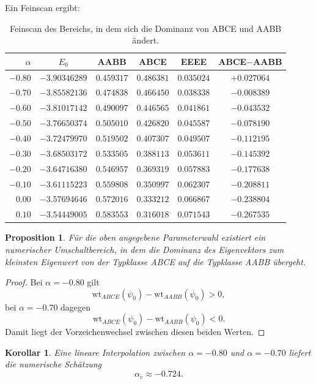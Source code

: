 \documentclass[11pt,a4paper]{article}
\newtheorem{proposition}[definition]{Proposition}
\newtheorem{corollary}[definition]{Korollar}
\theoremstyle{remark}
\newcommand{\wt}{\mathrm{wt}}
\begin{document}
	Ein Feinscan ergibt:
	
	\begin{table}[h]
		\centering
		\begin{tabular}{rccccc}
			\toprule
			$\alpha$ & $E_0$ & AABB & ABCE & EEEE & ABCE$-$AABB \\
			\midrule
			$-0.80$ & $-3.90346289$ & $0.459317$ & $0.486381$ & $0.035024$ & $+0.027064$ \\
			$-0.70$ & $-3.85582136$ & $0.474838$ & $0.466450$ & $0.038338$ & $-0.008389$ \\
			$-0.60$ & $-3.81017142$ & $0.490097$ & $0.446565$ & $0.041861$ & $-0.043532$ \\
			$-0.50$ & $-3.76650374$ & $0.505010$ & $0.426820$ & $0.045587$ & $-0.078190$ \\
			$-0.40$ & $-3.72479970$ & $0.519502$ & $0.407307$ & $0.049507$ & $-0.112195$ \\
			$-0.30$ & $-3.68503172$ & $0.533505$ & $0.388113$ & $0.053611$ & $-0.145392$ \\
			$-0.20$ & $-3.64716380$ & $0.546957$ & $0.369319$ & $0.057883$ & $-0.177638$ \\
			$-0.10$ & $-3.61115223$ & $0.559808$ & $0.350997$ & $0.062307$ & $-0.208811$ \\
			$0.00$  & $-3.57694646$ & $0.572016$ & $0.333212$ & $0.066867$ & $-0.238804$ \\
			$0.10$  & $-3.54449005$ & $0.583553$ & $0.316018$ & $0.071543$ & $-0.267535$ \\
			\bottomrule
		\end{tabular}
		\caption{Feinscan des Bereichs, in dem sich die Dominanz von ABCE und AABB ändert.}
	\end{table}
	
	\begin{proposition}
		Für die oben angegebene Parameterwahl existiert ein numerischer Umschaltbereich, in dem die Dominanz des Eigenvektors zum kleinsten Eigenwert von der Typklasse ABCE auf die Typklasse AABB übergeht.
	\end{proposition}
	
	\begin{proof}
		Bei \(\alpha=-0.80\) gilt
		\[
		\wt_{ABCE}(\psi_0)-\wt_{AABB}(\psi_0)>0,
		\]
		bei \(\alpha=-0.70\) dagegen
		\[
		\wt_{ABCE}(\psi_0)-\wt_{AABB}(\psi_0)<0.
		\]
		Damit liegt der Vorzeichenwechsel zwischen diesen beiden Werten.
	\end{proof}
	
	\begin{corollary}
		Eine lineare Interpolation zwischen \(\alpha=-0.80\) und \(\alpha=-0.70\) liefert die numerische Schätzung
		\[
		\alpha_c\approx -0.724.
		\]
	\end{corollary}
	
\end{document}
